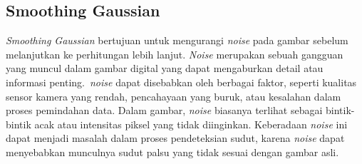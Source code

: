 
\subsection{Smoothing Gaussian}
   \emph{Smoothing Gaussian} bertujuan untuk mengurangi \emph{noise} pada gambar sebelum melanjutkan ke perhitungan lebih lanjut.
\emph{Noise} merupakan sebuah gangguan yang muncul dalam gambar digital yang dapat mengaburkan detail atau informasi penting.~\emph{noise} dapat disebabkan oleh berbagai faktor, seperti kualitas sensor kamera yang rendah, pencahayaan yang buruk, atau kesalahan dalam proses pemindahan data.
Dalam gambar, \emph{noise} biasanya terlihat sebagai bintik-bintik acak atau intensitas piksel yang tidak diinginkan. Keberadaan \emph{noise} ini dapat menjadi masalah dalam proses pendeteksian sudut, karena \emph{noise} dapat menyebabkan munculnya sudut palsu yang tidak sesuai dengan gambar asli.
    
